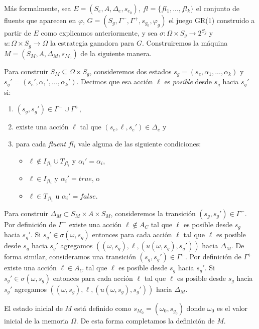 Más formalmente, sea $E = (S_e,A,\Delta_e,s_{e_0})$, $fl = \{fl_1,...,fl_k\}$ el conjunto de fluents que aparecen en
$\varphi$, $G = (S_g,\Gamma^-,\Gamma^+,s_{g_0},\varphi_g)$ el juego GR(1) construido a partir de $E$ como explicamos
anteriormente, y sea $\sigma: \Omega \times S_g \rightarrow 2^{S_g}$ y $u: \Omega \times S_g \rightarrow \Omega$ la
estrategia ganadora para $G$. Construiremos la máquina $M = (S_M, A, \Delta_M, s_{M_0})$ de la siguiente manera.

Para construir $S_M \subseteq \Omega \times S_g$, consideremos dos estados $s_g = (s_e,\alpha_1,...,\alpha_k)$ y $s_g' =
(s_e',\alpha_1',...,\alpha_k')$. Decimos que esa acción $\ell$ es \emph{posible} desde $s_g$ hacia $s_g'$ si:

\begin{enumerate}
\itemsep-4mm
\item $(s_g,s_g') \in \Gamma^- \cup \Gamma^+$,
\item existe una acción $\ell$ tal que $(s_e,\ell,s_e') \in \Delta_e$ y
\item para cada \emph{fluent} $fl_i$ vale alguna de las siguiente condiciones:
\vspace{-4mm}
\begin{itemize}
    \itemsep-4mm
    \item $\ell \notin I_{fl_i} \cup T_{fl_i}$ y $\alpha_i' = \alpha_i$,
    \item $\ell \in I_{fl_i}$ y $\alpha_i'=true$, o
    \item $\ell \in T_{fl_i}$ u $\alpha_i'=false$.
\end{itemize}
\end{enumerate}

Para construir $\Delta_M \subset S_M \times A \times S_M$, consideremos la transición $(s_g,s_g') \in \Gamma^-$. Por
definición de $\Gamma^-$ existe una acción $\ell \notin A_C$ tal que $\ell$ es posible desde $s_g$ hacia $s_g'$. Si
$s_g' \in \sigma(\omega,s_g)$ entonces para cada acción $\ell$ tal que $\ell$ es posible desde $s_g$ hacia $s_g'$
agregamos $((\omega,s_g),\ell,(u(\omega,s_g),s_g'))$ hacia $\Delta_M$. De forma similar, consideramos una transición
$(s_g,s_g') \in \Gamma^+$. Por definición de $\Gamma^+$ existe una acción $\ell \in A_C$ tal que $\ell$ es posible desde
$s_g$ hacia $s_g'$. Si $s_g' \in \sigma(\omega,s_g)$ entonces para cada acción $\ell$ tal que $\ell$ es posible desde
$s_g$ hacia $s_g'$ agregamos $((\omega,s_g),\ell,(u(\omega,s_g),s_g'))$ hacia $\Delta_M$.

El estado inicial de $M$ está definido como $s_{M_0} = (\omega_0,s_{g_0})$ donde $\omega_0$ es el valor inicial de la
memoria $\Omega$. De esta forma completamos la definición de $M$.

